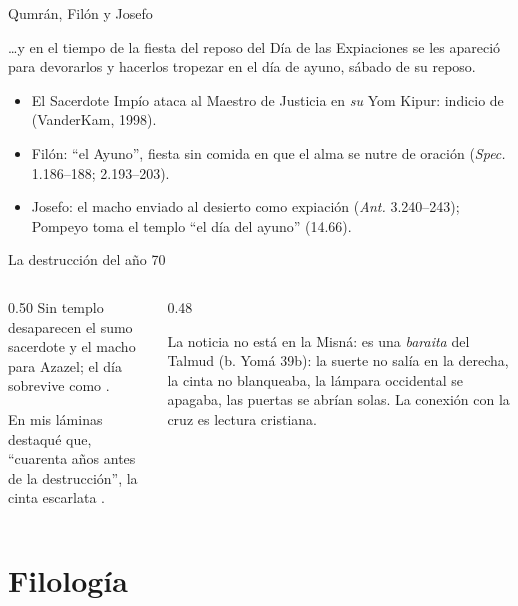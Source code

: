 \begin{frame}{Qumrán, Filón y Josefo}
\begin{cita}\ldots{}y en el tiempo de la fiesta del reposo del Día de las Expiaciones se les apareció para devorarlos y hacerlos tropezar en el día de ayuno, sábado de su reposo.\end{cita}
\scriptsize
\begin{itemize}
\item El Sacerdote Impío ataca al Maestro de Justicia en \emph{su} Yom Kipur: indicio de  (VanderKam, 1998).
\item Filón: ``el Ayuno'', fiesta sin comida en que el alma se nutre de oración (\emph{Spec.} 1.186--188; 2.193--203).
\item Josefo: el macho enviado al desierto como expiación (\emph{Ant.} 3.240--243); Pompeyo toma el templo ``el día del ayuno'' (14.66).
\end{itemize}
\end{frame}

\begin{frame}{La destrucción del año 70}
\begin{columns}[t,onlytextwidth]
\begin{column}{0.50\textwidth}\small
Sin templo desaparecen el sumo sacerdote y el macho para Azazel; el día sobrevive como .\par\medskip
En mis láminas destaqué que, ``cuarenta años antes de la destrucción'', la cinta escarlata .
\end{column}
\begin{column}{0.48\textwidth}
\begin{tcolorbox}[colback=mostaza!12,colframe=mostaza!80!tierraroja,boxrule=0.6pt,arc=2pt,fontupper=\scriptsize,title={\scriptsize Precisión},coltitle=caferojizo,colbacktitle=mostaza!35]
La noticia no está en la Misná: es una \emph{baraita} del Talmud (b. Yomá 39b): la suerte no salía en la derecha, la cinta no blanqueaba, la lámpara occidental se apagaba, las puertas se abrían solas. La conexión con la cruz es lectura cristiana.
\end{tcolorbox}
\end{column}
\end{columns}
\end{frame}

\section{Filología}

